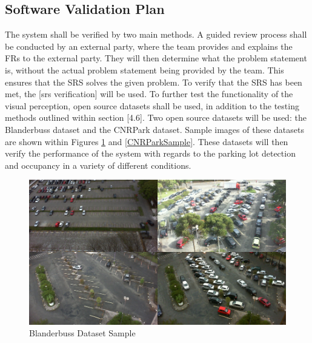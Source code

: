 \documentclass[12pt, titlepage]{article}
\begin{document}
\subsection{Software Validation Plan}

The system shall be verified by two main methods. A guided review process shall be conducted by an external party, where the team provides and explains the FRs to the external party. They will then determine what the problem statement is, without the actual problem statement being provided by the team. This ensures that the SRS solves the given problem. To verify that the SRS has been met, the [srs verification] will be used. To further test the functionality of the visual perception, open source datasets shall be used, in addition to the testing methods outlined within section [4.6]. Two open source datasets will be used: the Blanderbuss dataset and the CNRPark dataset. Sample images of these datasets are shown within Figures \ref{BlanderbussSample} and \ref{CNRParkSample}. These datasets will then verify the performance of the system with regards to the parking lot detection and occupancy in a variety of different conditions.  

\begin{figure}[h!]
  \begin{center} 
  \caption{Blanderbuss Dataset Sample}
  \label{BlanderbussSample}
        \includegraphics[width=1\textwidth]{VnVPlan/BlanderbussDataset.png}
  \end{center}
\end{figure}
\end{document}
